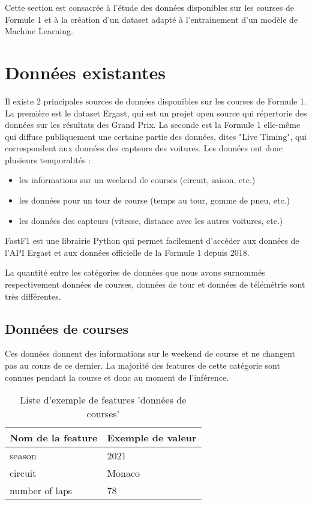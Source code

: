 Cette section est consacrée à l'étude des données disponibles sur les courses de Formule 1 et à la création d'un dataset adapté
à l'entrainement d'un modèle de Machine Learning.

\section{Données existantes}

Il existe 2 principales sources de données disponibles sur les courses de Formule 1.
La première est le dataset Ergast, qui est un projet open source qui répertorie des données sur les résultats des Grand Prix.
La seconde est la Formule 1 elle-même qui diffuse publiquement une certaine partie des données, dites "Live Timing",
qui correspondent aux données des capteurs des voitures.
Les données ont donc plusieurs temporalités :
\begin{itemize}
    \item les informations sur un weekend de courses (circuit, saison, etc.)
    \item les données pour un tour de course (temps au tour, gomme de pneu, etc.)
    \item les données des capteurs (vitesse, distance avec les autres voitures, etc.)
\end{itemize}

FastF1 est une librairie Python qui permet facilement d'accéder aux données de l'API Ergast et aux données officielle de la Formule 1 depuis 2018.

La quantité entre les catégories de données que nous avons surnommés respectivement données de courses, données de tour et données de télémétrie
sont très différentes.


\subsection{Données de courses}
Ces données donnent des informations sur le weekend de course et ne changent pas au cours de ce dernier.
La majorité des features de cette catégorie sont connues pendant la course et donc au moment de l'inférence.

\begin{table}[h]
    \begin{center}
        \caption{Liste d'exemple de features 'données de courses'}
        \begin{tabular}{l|l}
            Nom de la feature & Exemple de valeur \\ \hline
            season            & 2021              \\
            circuit           & Monaco            \\
            number of laps    & 78
        \end{tabular}
    \end{center}
\end{table}

